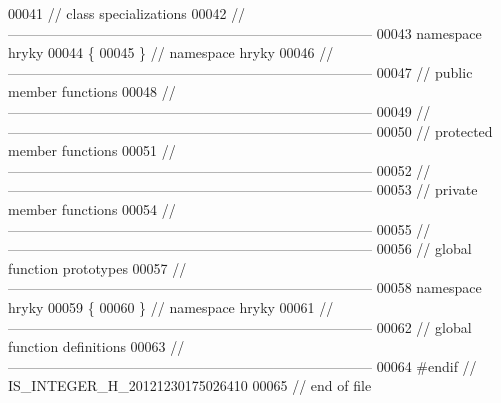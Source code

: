 \begin{DoxyCode}
00041 \textcolor{comment}{// class specializations}
00042 \textcolor{comment}{//
      ------------------------------------------------------------------------------}
00043 \textcolor{keyword}{namespace }hryky
00044 \{
00045 \} \textcolor{comment}{// namespace hryky}
00046 \textcolor{comment}{//
      ------------------------------------------------------------------------------}
00047 \textcolor{comment}{// public member functions}
00048 \textcolor{comment}{//
      ------------------------------------------------------------------------------}
00049 \textcolor{comment}{//
      ------------------------------------------------------------------------------}
00050 \textcolor{comment}{// protected member functions}
00051 \textcolor{comment}{//
      ------------------------------------------------------------------------------}
00052 \textcolor{comment}{//
      ------------------------------------------------------------------------------}
00053 \textcolor{comment}{// private member functions}
00054 \textcolor{comment}{//
      ------------------------------------------------------------------------------}
00055 \textcolor{comment}{//
      ------------------------------------------------------------------------------}
00056 \textcolor{comment}{// global function prototypes}
00057 \textcolor{comment}{//
      ------------------------------------------------------------------------------}
00058 \textcolor{keyword}{namespace }hryky
00059 \{
00060 \} \textcolor{comment}{// namespace hryky}
00061 \textcolor{comment}{//
      ------------------------------------------------------------------------------}
00062 \textcolor{comment}{// global function definitions}
00063 \textcolor{comment}{//
      ------------------------------------------------------------------------------}
00064 \textcolor{preprocessor}{#endif // IS\_INTEGER\_H\_20121230175026410}
00065 \textcolor{preprocessor}{}\textcolor{comment}{// end of file}
\end{DoxyCode}
